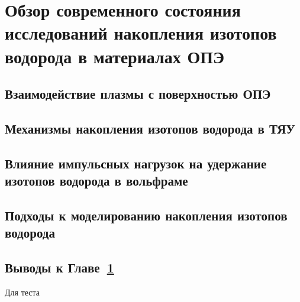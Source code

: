 \chapter{Обзор современного состояния исследований накопления изотопов водорода в материалах ОПЭ}\label{ch:ch1}


\section{Взаимодействие плазмы с поверхностью ОПЭ}\label{sec:ch1/sec1}
\section{Механизмы накопления изотопов водорода в ТЯУ}\label{sec:ch1/sec2}
\section{Влияние импульсных нагрузок на удержание изотопов водорода в вольфраме}\label{sec:ch1/sec3}
\section{Подходы к моделированию накопления изотопов водорода}\label{sec:ch1/sec4}
\section{Выводы к Главе~\ref{ch:ch1}}\label{sec:ch1/sec5}

Для теста~\autocite{Kulagin2022a_rus}


\FloatBarrier
